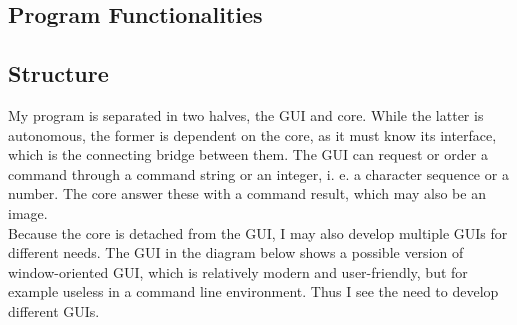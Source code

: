 \documentclass[10pt,a4paper,titlepage]{article}
\begin{document}
	\subsection{Program Functionalities}
	\subsection{Structure}
	My program is separated in two halves, the GUI and core. While the latter is autonomous, the former is dependent on the core, as it must know its interface, which is the connecting bridge between them. The GUI can request or order a command through a command string or an integer, i. e. a character sequence or a number. The core answer these with a command result, which may also be an image.\\
	Because the core is detached from the GUI, I may also develop multiple GUIs for different needs. The GUI in the diagram below shows a possible version of window-oriented GUI, which is relatively modern and user-friendly, but for example useless in a command line environment. Thus I see the need to develop different GUIs.
	
\end{document}
